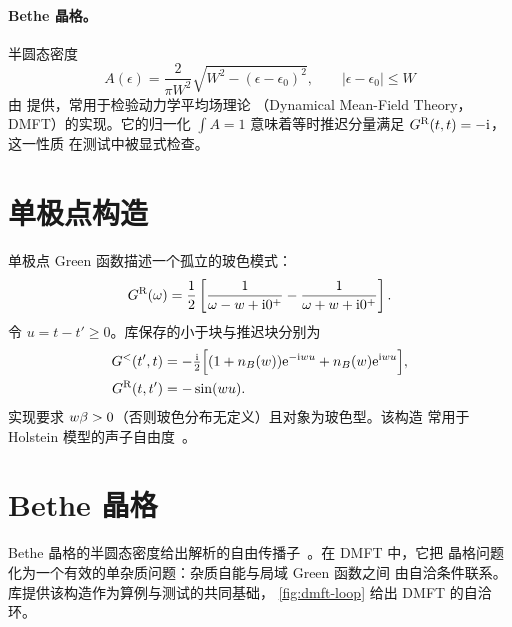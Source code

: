 \paragraph{Bethe 晶格。}
半圆态密度
\begin{equation}
    A(\epsilon) = \frac{2}{\pi W^2}
    \sqrt{W^2-(\epsilon-\epsilon_0)^2},
    \qquad |\epsilon-\epsilon_0|\le W
\end{equation}
由  提供，常用于检验动力学平均场理论
（Dynamical Mean-Field Theory，DMFT）的实现。它的归一化
$\int A=1$ 意味着等时推迟分量满足 $G^{\mathrm{R}}(t,t)=-\mathrm{i}$，这一性质
在测试中被显式检查。

\section{单极点构造}
\label{sec:pole}

单极点 Green 函数描述一个孤立的玻色模式：
\begin{equation}
    G^{\mathrm{R}}(\omega) = \frac12\left[
        \frac{1}{\omega-w+\mathrm{i} 0^+} - \frac{1}{\omega+w+\mathrm{i} 0^+}\right].
\end{equation}
令 $u=t-t'\ge0$。库保存的小于块与推迟块分别为
\begin{align}
    G^{<}(t',t) &= -\tfrac{\mathrm{i}}{2}\Big[
        (1+n_B(w))\mathrm{e}^{-\mathrm{i} wu}+n_B(w)\mathrm{e}^{\mathrm{i} wu}\Big],\\
    G^{\mathrm{R}}(t,t') &= -\sin(wu).
\end{align}
实现要求 $w\beta>0$（否则玻色分布无定义）且对象为玻色型。该构造
常用于 Holstein 模型的声子自由度~\cite{werner2009}。

\section{Bethe 晶格}
\label{sec:bethe}

Bethe 晶格的半圆态密度给出解析的自由传播子~\cite{freericks2006}。在 DMFT 中，它把
晶格问题化为一个有效的单杂质问题：杂质自能与局域 Green 函数之间
由自洽条件联系。库提供该构造作为算例与测试的共同基础，
\cref{fig:dmft-loop} 给出 DMFT 的自洽环。

